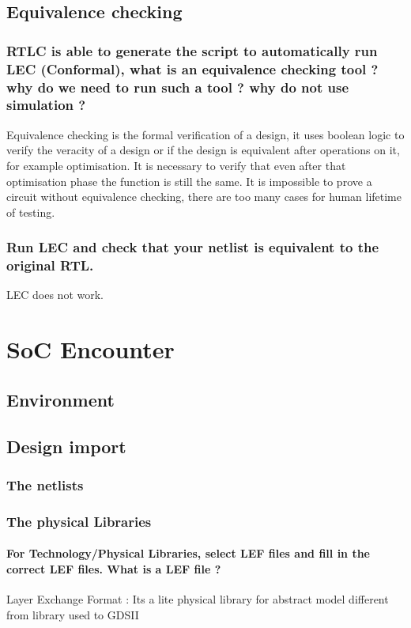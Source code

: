 \documentclass[11pt,a4paper,sans,dvipsnames]{report}
\begin{document}
	\section{Equivalence checking}
	\subsection*{RTLC is able to generate the script to automatically run LEC (Conformal), what is an equivalence checking tool ? why do we need to run such a tool ? why do not use simulation ?}
	Equivalence checking is the formal verification of a design, it uses boolean logic to verify the veracity of a design or if the design is equivalent after operations on it, for example optimisation. It is necessary to verify that even after that optimisation phase the function is still the same. It is impossible to prove a circuit without equivalence checking, there are too many cases for human lifetime of testing.

	\subsection*{Run LEC and check that your netlist is equivalent to the original RTL.}
	LEC does not work.

	\newpage
	\chapter{SoC Encounter}
	\section{Environment}
	\section{Design import}
	\subsection*{The netlists}
	\subsection*{The physical Libraries}
	\subsubsection*{For Technology/Physical Libraries, select LEF files and fill in the correct LEF files. What is a LEF file ?}
	Layer Exchange Format : Its a lite physical library for abstract model different from library used to GDSII
\end{document}
